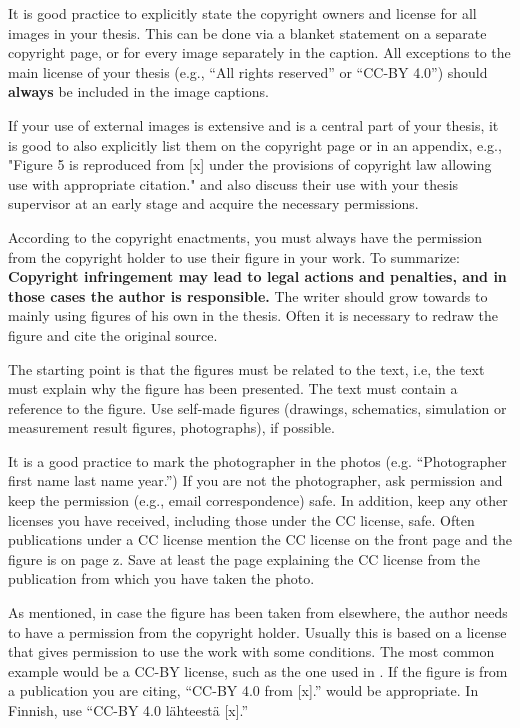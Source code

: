 It is good practice to explicitly state the copyright owners and
license for all images in your thesis. This can be done via a blanket
statement on a separate copyright page, or for every image separately
in the caption. All exceptions to the main license of your thesis
(e.g., ``All rights reserved'' or ``CC-BY 4.0'') should
\textbf{always} be included in the image captions.

If your use of external images is extensive and is a central part of
your thesis, it is good to also explicitly list them on the copyright
page or in an appendix, e.g., "Figure 5 is reproduced from [x] under
the provisions of copyright law allowing use with appropriate
citation." and also discuss their use with your thesis supervisor at
an early stage and acquire the necessary permissions.

According to the copyright enactments, you must always have the
permission from the copyright holder to use their figure in your
work. To summarize: \textbf{Copyright infringement may lead to legal
  actions and penalties, and in those cases the author is
  responsible.} The writer should grow towards to mainly using figures
of his own in the thesis. Often it is necessary to redraw the figure
and cite the original source.

The starting point is that the figures must be related to the text,
i.e, the text must explain why the figure has been presented. The text
must contain a reference to the figure. Use self-made figures
(drawings, schematics, simulation or measurement result figures,
photographs), if possible.

It is a good practice to mark the photographer in the photos
(e.g. “Photographer first name last name year.”) If you are not the
photographer, ask permission and keep the permission (e.g., email
correspondence) safe. In addition, keep any other licenses you have
received, including those under the CC license, safe. Often
publications under a CC license mention the CC license on the front
page and the figure is on page z. Save at least the page explaining
the CC license from the publication from which you have taken the
photo.

As mentioned, in case the figure has been taken from elsewhere, the
author needs to have a permission from the copyright holder. Usually
this is based on a license that gives permission to use the work with
some conditions. The most common example would be a CC-BY license,
such as the one used in . If the figure is from a
publication you are citing, ``CC-BY 4.0 from [x].'' would be
appropriate. In Finnish, use ``CC-BY 4.0 lähteestä [x].''

